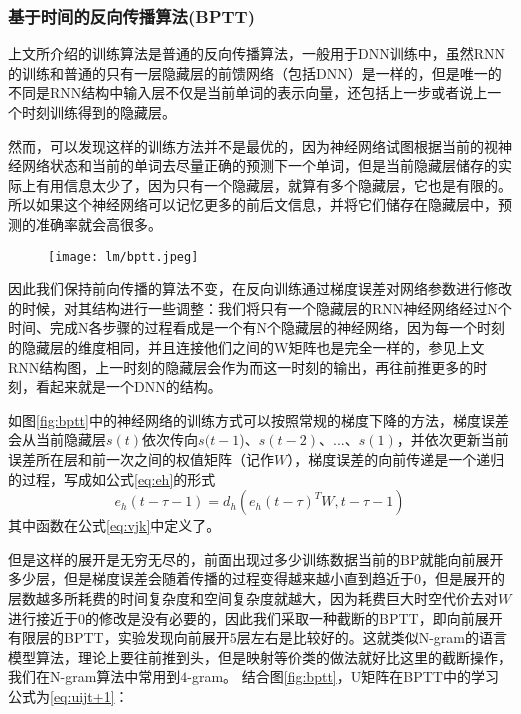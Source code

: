 \subsubsection{基于时间的反向传播算法(BPTT)}
上文所介绍的训练算法是普通的反向传播算法，一般用于DNN训练中，虽然RNN的训练和普通的只有一层隐藏层的前馈网络（包括DNN）是一样的，但是唯一的不同是RNN结构中输入层不仅是当前单词的表示向量，还包括上一步或者说上一个时刻训练得到的隐藏层。 


然而，可以发现这样的训练方法并不是最优的，因为神经网络试图根据当前的视神经网络状态和当前的单词去尽量正确的预测下一个单词，但是当前隐藏层储存的实际上有用信息太少了，因为只有一个隐藏层，就算有多个隐藏层，它也是有限的。所以如果这个神经网络可以记忆更多的前后文信息，并将它们储存在隐藏层中，预测的准确率就会高很多。

\begin{figure}[!htbp]
  \centering
  \begin{minipage}[b]{0.6\textwidth}
    \captionstyle{\centering}
    \centering
    \texttt{[image: lm/bptt.jpeg]}
  \end{minipage}     
\end{figure}

因此我们保持前向传播的算法不变，在反向训练通过梯度误差对网络参数进行修改的时候，对其结构进行一些调整：我们将只有一个隐藏层的RNN神经网络经过N个时间、完成N各步骤的过程看成是一个有N个隐藏层的神经网络，因为每一个时刻的隐藏层的维度相同，并且连接他们之间的W矩阵也是完全一样的，参见上文RNN结构图，上一时刻的隐藏层会作为而这一时刻的输出，再往前推更多的时刻，看起来就是一个DNN的结构。

如图\ref{fig:bptt}中的神经网络的训练方式可以按照常规的梯度下降的方法，梯度误差会从当前隐藏层$s(t)$依次传向$s(t-1$)、$s(t-2)$、$...$、$s(1)$，并依次更新当前误差所在层和前一次之间的权值矩阵（记作$W$），梯度误差的向前传递是一个递归的过程，写成如公式\ref{eq:eh}的形式
\begin{equation}
	\label{eq:eh}
   	{e_h}\left( {t - \tau  - 1} \right) = {d_h}\left( {{e_h}{{\left( {t - \tau } \right)}^T}W,t - \tau  - 1} \right)
\end{equation}
其中函数在公式\ref{eq:vjk}中定义了。

	但是这样的展开是无穷无尽的，前面出现过多少训练数据当前的BP就能向前展开多少层，但是梯度误差会随着传播的过程变得越来越小直到趋近于$0$，但是展开的层数越多所耗费的时间复杂度和空间复杂度就越大，因为耗费巨大时空代价去对$W$进行接近于$0$的修改是没有必要的，因此我们采取一种截断的BPTT，即向前展开有限层的BPTT，实验发现向前展开$5$层左右是比较好的。这就类似N-gram的语言模型算法，理论上要往前推到头，但是映射等价类的做法就好比这里的截断操作，我们在N-gram算法中常用到$4$-gram。
	结合图\ref{fig:bptt}，U矩阵在BPTT中的学习公式为\ref{eq:uijt+1}：
    
